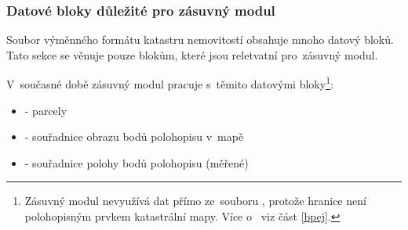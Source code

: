 \subsubsection{Datové bloky důležité pro zásuvný modul}
\label{datove_bloky_zasuvny_modul}

Soubor výměnného formátu katastru nemovitostí obsahuje mnoho datový bloků. Tato sekce se věnuje pouze blokům, které jsou reletvatní pro~zásuvný modul.

V~současné době zásuvný modul pracuje s~těmito datovými bloky\footnote{Zásuvný modul nevyužívá dat  přímo ze~souboru , protože hranice  není polohopisným prvkem katastrální mapy. Více o~ viz část \ref{bpej}.}:

	\begin{itemize}[leftmargin=1.5cm, noitemsep]
		\item {} - parcely
		\item {} - souřadnice obrazu bodů polohopisu v~mapě
		\item {} - souřadnice polohy bodů polohopisu (měřené)
	\end{itemize}

